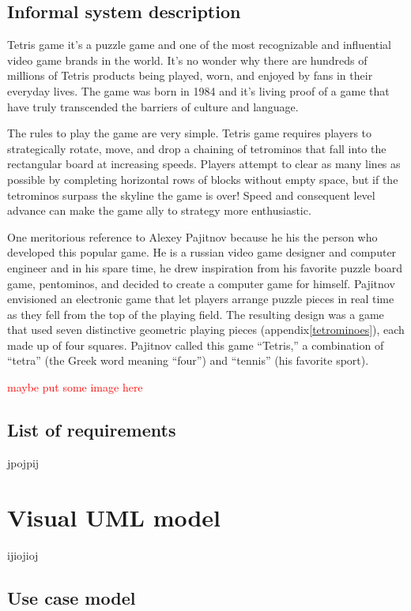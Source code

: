 \documentclass[a4paper]{article}
\begin{document}
\subsection{Informal system description}

Tetris game it's a puzzle game and one of the most recognizable and influential video game brands in the world. It’s no wonder why there are hundreds of millions of Tetris products being played, worn, and enjoyed by fans in their everyday lives. The game was born in 1984 and it's living proof of a game that have truly transcended the barriers of culture and language.

The rules to play the game are very simple. Tetris game requires players to strategically rotate, move, and drop a chaining of tetrominos that fall into the rectangular board at increasing speeds. Players attempt to clear as many lines as possible by completing horizontal rows of blocks without empty space, but if the tetrominos surpass the skyline the game is over! Speed and consequent level advance can make the game ally to strategy more enthusiastic.

One meritorious reference to Alexey Pajitnov because he his the person who developed this popular game. He is a russian video game designer and computer engineer and in his spare time, he drew inspiration from his favorite puzzle board game, pentominos, and decided to create a computer game for himself. Pajitnov envisioned an electronic game that let players arrange puzzle pieces in real time as they fell from the top of the playing field. The resulting design was a game that used seven distinctive geometric playing pieces (appendix\ref{tetrominoes}), each made up of four squares. Pajitnov called this game “Tetris,” a combination of “tetra” (the Greek word meaning “four”) and “tennis” (his favorite sport).

\textcolor{red}{maybe put some image here}
\subsection{List of requirements}

jpojpij

\section{Visual UML model} 

ijiojioj

\subsection{Use case model}
\end{document}
